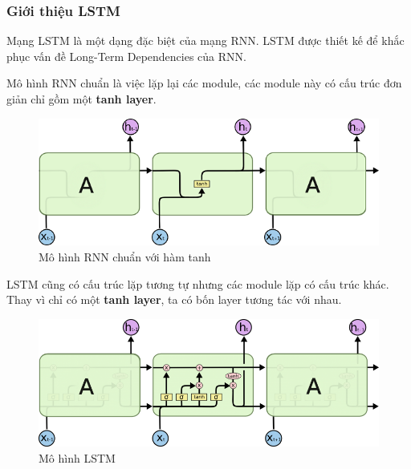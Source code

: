 \documentclass[a4paper,12pt]{report}
\begin{document}
\subsubsection{Giới thiệu LSTM}
Mạng LSTM là một dạng đặc biệt của mạng RNN. LSTM được thiết kế để khắc phục vấn đề Long-Term Dependencies của RNN. 
\par Mô hình RNN chuẩn là việc lặp lại các module, các module này có cấu trúc đơn giản chỉ gồm một \textbf{tanh layer}.
\begin{figure}[H]
\centering
\includegraphics[scale=0.7]{rnn_tanh.jpg}
\caption{Mô hình RNN chuẩn với hàm tanh}
\end{figure}
\par LSTM cũng có cấu trúc lặp tương tự nhưng các module lặp có cấu trúc khác. Thay vì chỉ có một \textbf{tanh layer}, ta có bốn layer tương tác với nhau. 
\begin{figure}[H]
\centering
\includegraphics[scale=0.4]{lstm.png}
\caption{Mô hình LSTM}
\end{figure} 
\end{document}
